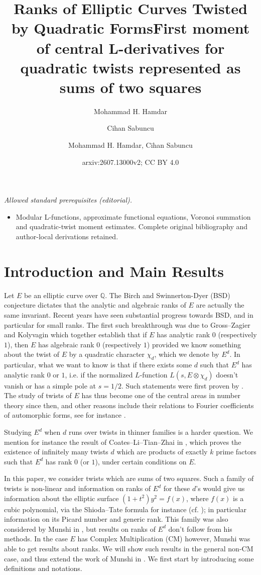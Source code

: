 \documentclass[12pt]{amsart}
\title{Ranks of Elliptic Curves Twisted by Quadratic Forms}
\author{Mohammad H. Hamdar}
\author{Cihan Sabuncu}
\title{First moment of central L-derivatives for quadratic twists represented as sums of two squares}
\author{Mohammad H. Hamdar, Cihan Sabuncu}
\date{arxiv:2607.13000v2; CC BY 4.0}
\def\Q{\mathbb{Q}}
\def\Q{\mathbb Q}
\def\Q{\mathbb Q}
\begin{document}
\maketitle
\noindent\textit{Allowed standard prerequisites (editorial).}\begin{itemize}
\item Modular L-functions, approximate functional equations, Voronoi summation and quadratic-twist moment estimates. Complete original bibliography and author-local derivations retained.
\end{itemize}\medskip
\section{Introduction and Main Results}

Let $E$ be an elliptic curve over $\Q$. The Birch and Swinnerton-Dyer (BSD) conjecture dictates that the analytic and algebraic ranks of $E$ are actually the same invariant. Recent years have seen substantial progress towards BSD, and in particular for small ranks. The first such breakthrough was due to Gross--Zagier \cite{grosszagier} and Kolyvagin \cite{Kolyvagin1} which together establish that if $E$ has analytic rank $0$ (respectively $1$), then $E$ has algebraic rank $0$ (respectively $1$) provided we know something about the  twist of $E$ by a quadratic character $\chi_d$, which we denote by $E^d$. In particular, what we want to know is that if there exists some $d$ such that $E^d$ has analytic rank $0$ or $1$, i.e. if the normalized $L$-function $L(s,E\otimes\chi_d)$ doesn't vanish or has a simple pole at $s=1/2$. Such statements were first proven by \cite{waldspurger, MurtyMurty,BumpFrieHoff}. The study of twists of $E$ has thus become one of the central areas in number theory since then, and other reasons include their relations to Fourier coefficients of automorphic forms, see for instance \cite{wald2, kohnenzagier}.

Studying $E^d$ when $d$ runs over twists in thinner families is a harder question. We mention for instance the result of Coates--Li--Tian--Zhai in \cite{Coates}, which proves the existence of infinitely many twists $d$ which are products of exactly $k$ prime factors such that $E^d$ has rank $0$ (or $1$), under certain conditions on $E$.

In this paper, we consider twists which are sums of two squares. Such a family of twists is non-linear and information on ranks of $E^d$ for these $d$'s would give us information about the elliptic surface $(1+t^2)y^2=f(x)$, where $f(x)$ is a cubic polynomial, via the Shioda--Tate formula for instance (cf. \cite{shioda}); in particular information on its Picard number and generic rank. This family was also considered by Munshi in \cite{Munshi1}, but results on ranks of $E^d$ don't follow from his methods. In the case $E$ has Complex Multiplication (CM) however, Munshi \cite{Munshi2} was able to get results about ranks. We will show such results in the general non-CM case, and thus extend the work of Munshi in \cite{Munshi1}. We first start by introducing some definitions and notations.
\end{document}

